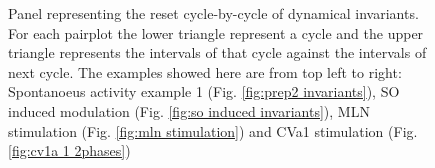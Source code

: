 \begin{figure}[htbp]
	\caption{Panel representing the reset cycle-by-cycle of dynamical invariants. For each pairplot the lower triangle represent a cycle and the upper triangle represents the intervals of that cycle against the intervals of next cycle. The examples showed here are from top left to right: Spontanoeus activity example 1 (Fig. \ref{fig:prep2 invariants}), SO induced modulation (Fig. \ref{fig:so induced invariants}), MLN stimulation (Fig. \ref{fig:mln stimulation}) and CVa1 stimulation (Fig. \ref{fig:cv1a 1 2phases})}
	\label{fig:reset pairplot comparison}
\end{figure}

\clearpage
\newpage
